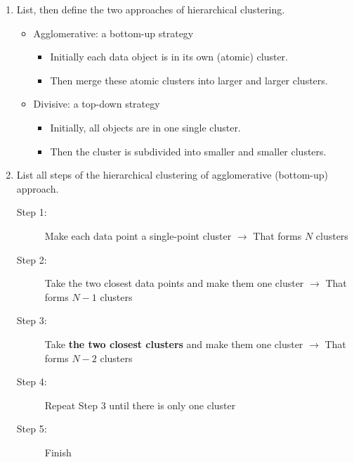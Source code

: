 \documentclass[12pt]{article}
\newenvironment{QandA}{\begin{enumerate}[label=\bfseries\arabic*.]\bfseries}
{\end{enumerate}}
\newenvironment{answered}{\par\normalfont\color{Sepia}}{}
\begin{document}
\begin{QandA}
    \item List, then define the two approaches of hierarchical clustering.
    \begin{answered}
        \begin{itemize}
            \item Agglomerative: a bottom-up strategy
            \begin{itemize}
                \item Initially each data object is in its own (atomic) cluster.
                \item Then merge these atomic clusters into larger and larger clusters.
            \end{itemize}
            \item Divisive: a top-down strategy
            \begin{itemize}
                \item Initially, all objects are in one single cluster.
                \item Then the cluster is subdivided into smaller and smaller clusters.
            \end{itemize}
        \end{itemize}
    \end{answered}

    \item List all steps of the hierarchical clustering of agglomerative (bottom-up) approach.
    \begin{answered}
        \begin{description}
            \item[Step 1:] Make each data point a single-point cluster $\rightarrow$ That forms $N$ clusters
            \item[Step 2:] Take the two closest data points and make them one cluster $\rightarrow$ That forms $N - 1$ clusters
            \item[Step 3:] Take \textbf{the two closest clusters} and make them one cluster $\rightarrow$ That forms $N - 2$ clusters
            \item[Step 4:] Repeat Step 3 until there is only one cluster
            \item[Step 5:] Finish
        \end{description}
    \end{answered}


\end{QandA}
\end{document}
